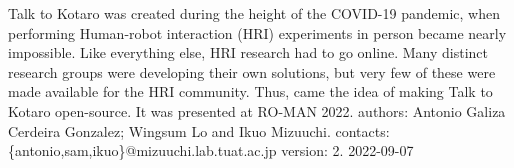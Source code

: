 Talk to Kotaro was created during the height of the COVID-\/19 pandemic, when performing Human-\/robot interaction (HRI) experiments in person became nearly impossible. Like everything else, HRI research had to go online. Many distinct research groups were developing their own solutions, but very few of these were made available for the HRI community. Thus, came the idea of making Talk to Kotaro open-\/source. It was presented at RO-\/\+MAN 2022. authors\+: Antonio Galiza Cerdeira Gonzalez; Wingsum Lo and Ikuo Mizuuchi. contacts\+: \{antonio,sam,ikuo\}@mizuuchi.lab.\+tuat.\+ac.\+jp version\+: 2. 2022-\/09-\/07 
